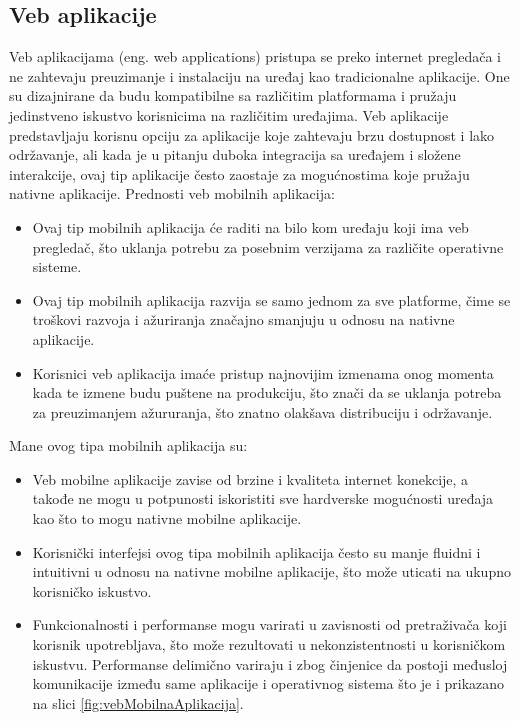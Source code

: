 \documentclass[12pt,oneside]{memoir}
\begin{document}
\subsection{Veb aplikacije}

Veb aplikacijama (eng. web applications) pristupa se preko internet pregledača i ne zahtevaju preuzimanje i instalaciju na uređaj kao tradicionalne aplikacije. One su dizajnirane da budu kompatibilne sa različitim platformama i pružaju jedinstveno iskustvo korisnicima na različitim uređajima. Veb aplikacije predstavljaju korisnu opciju za aplikacije koje zahtevaju brzu dostupnost i lako održavanje, ali kada je u pitanju duboka integracija sa uređajem i složene interakcije, ovaj tip aplikacije često zaostaje za mogućnostima koje pružaju nativne aplikacije. Prednosti veb mobilnih aplikacija:

\begin{itemize}
    \item Ovaj tip mobilnih aplikacija će raditi na bilo kom uređaju koji ima veb pregledač, što uklanja potrebu za posebnim verzijama za različite operativne sisteme.
    \item Ovaj tip mobilnih aplikacija razvija se samo jednom za sve platforme, čime se troškovi razvoja i ažuriranja značajno smanjuju u odnosu na nativne aplikacije.
    \item Korisnici veb aplikacija imaće pristup najnovijim izmenama onog momenta kada te izmene budu puštene na produkciju, što znači da se uklanja potreba za preuzimanjem ažururanja, što znatno olakšava distribuciju i održavanje.
\end{itemize}
Mane ovog tipa mobilnih aplikacija su:
\begin{itemize}
    \item Veb mobilne aplikacije zavise od brzine i kvaliteta internet konekcije, a takođe ne mogu u potpunosti iskoristiti sve hardverske mogućnosti uređaja kao što to mogu nativne mobilne aplikacije.
    \item Korisnički interfejsi ovog tipa mobilnih aplikacija često su manje fluidni i intuitivni u odnosu na nativne mobilne aplikacije, što može uticati na ukupno korisničko iskustvo.
    \item Funkcionalnosti i performanse mogu varirati u zavisnosti od pretraživača koji korisnik upotrebljava, što može rezultovati u nekonzistentnosti u korisničkom iskustvu. Performanse delimično variraju i zbog činjenice da postoji međusloj komunikacije između same aplikacije i operativnog sistema što je i prikazano na slici \ref{fig:vebMobilnaAplikacija}.
\end{itemize}
\end{document}
